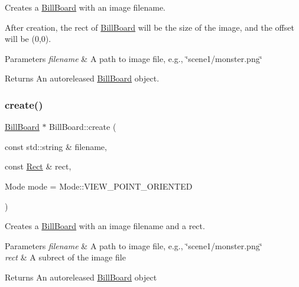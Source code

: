 Creates a \hyperlink{classBillBoard}{Bill\+Board} with an image filename.

After creation, the rect of \hyperlink{classBillBoard}{Bill\+Board} will be the size of the image, and the offset will be (0,0).


\begin{DoxyParams}{Parameters}
{\em filename} & A path to image file, e.\+g., \char`\"{}scene1/monster.\+png\char`\"{} \\
\hline
\end{DoxyParams}
\begin{DoxyReturn}{Returns}
An autoreleased \hyperlink{classBillBoard}{Bill\+Board} object. 
\end{DoxyReturn}
\mbox{\label{classBillBoard_aba3108c387dfb5290021e73aaa73557c}} 
\subsubsection{\texorpdfstring{create()}{create()}\hspace{0.1cm}{\footnotesize\ttfamily [5/6]}}
{\footnotesize\ttfamily \hyperlink{classBillBoard}{Bill\+Board} $\ast$ Bill\+Board\+::create (\begin{DoxyParamCaption}\item[{const std\+::string \&}]{filename,  }\item[{const \hyperlink{classRect}{Rect} \&}]{rect,  }\item[{Mode}]{mode = {\ttfamily Mode\+:\+:VIEW\+\_\+POINT\+\_\+ORIENTED} }\end{DoxyParamCaption})\hspace{0.3cm}{\ttfamily [static]}}

Creates a \hyperlink{classBillBoard}{Bill\+Board} with an image filename and a rect.


\begin{DoxyParams}{Parameters}
{\em filename} & A path to image file, e.\+g., \char`\"{}scene1/monster.\+png\char`\"{} \\
\hline
{\em rect} & A subrect of the image file \\
\hline
\end{DoxyParams}
\begin{DoxyReturn}{Returns}
An autoreleased \hyperlink{classBillBoard}{Bill\+Board} object 
\end{DoxyReturn}
\mbox{\label{classBillBoard_a802de5ef987024f2c1292ef504922058}} 
